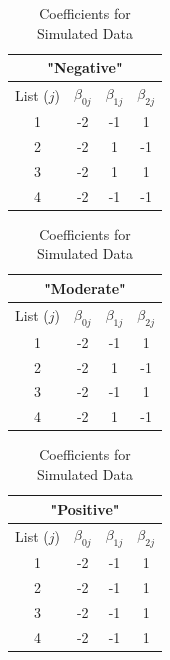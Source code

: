 \documentclass[
  12pt,
]{article}
\begin{document}
\singlespacing
\begin{table}[H]
\centering
\begin{tabular}{||c c c c||} 
 \hline
 \multicolumn{4}{||c||}{"Negative"}\\
 \hline
 List ($j$) & $\beta_{0j}$ & $\beta_{1j}$ & $\beta_{2j}$   \\ [0.5ex] 
 \hline\hline
 1 & -2 &  -1  & 1 \\ 
 2 & -2 & 1  &  -1 \\
 3 & -2 & 1  &  1 \\
 4 & -2 &  -1  &  -1 \\
 \hline
\end{tabular}
\begin{tabular}{||c c c c||} 
\hline
 \multicolumn{4}{||c||}{"Moderate"}\\
 \hline
 List ($j$) & $\beta_{0j}$ & $\beta_{1j}$ & $\beta_{2j}$   \\ [0.5ex] 
 \hline\hline
 1 & -2 &  -1  & 1 \\ 
 2 & -2 & 1  &  -1 \\
 3 & -2 & -1  &  1 \\
 4 & -2 &  1  &  -1 \\
 \hline
\end{tabular}
\begin{tabular}{||c c c c||} 
 \hline
 \multicolumn{4}{||c||}{"Positive"}\\
 \hline
 List ($j$) & $\beta_{0j}$ & $\beta_{1j}$ & $\beta_{2j}$   \\ [0.5ex] 
 \hline\hline
 1 & -2 &  -1  & 1 \\ 
 2 & -2 & -1  &  1 \\
 3 & -2 & -1  &  1 \\
 4 & -2 &  -1  &  1 \\
 \hline
\end{tabular}
\caption{Coefficients for Simulated Data}
\label{table:1}
\end{table}
\doublespacing
\end{document}
